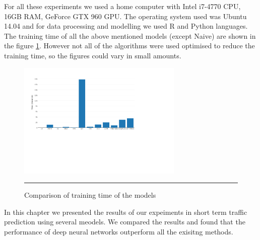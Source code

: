 For all these experiments we used a home computer with Intel i7-4770 CPU, 16GB RAM, GeForce GTX 960
GPU. The operating system used was Ubuntu 14.04 and for data processing and modelling we used R and
Python languages. The training time of all the above mentioned models (except Naive)  are shown in
the figure \ref{fig:trainingTime}. However not all of the algorithms were used optimised to reduce
the training time, so the figures could vary in small amounts.

\begin{figure}[htbp]
    \centering
    \includegraphics[width=0.7\textwidth]{Plots/training-time.pdf}
    \rule{35em}{0.5pt}
    \caption[Comparison of training time of the models]{Comparison of training time of the models}
    \label{fig:trainingTime}
\end{figure}

In this chapter we presented the results of our expeiments in short term traffic prediction using
several meodels. We compared the results and found that the performance of deep neural networks
outperform all the exisitng methods.